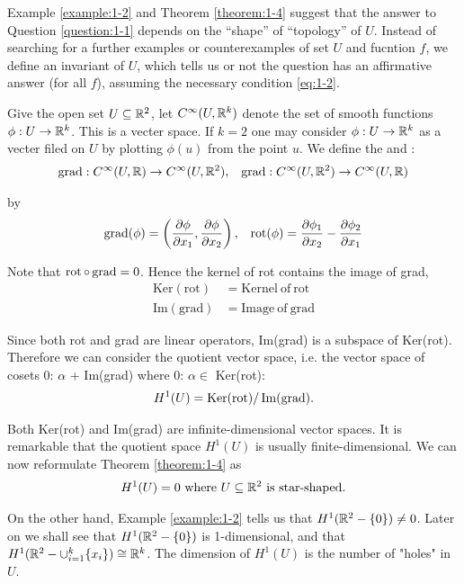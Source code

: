 Example \ref{example:1-2} and Theorem \ref{theorem:1-4} suggest that the answer to Question \ref{question:1-1} depends on the ``shape'' of
``topology'' of $U$. Instead of searching for a further examples or counterexamples of set $U$ and fucntion $f$, we
define an invariant of $U$, which tells us or not the question has an affirmative answer (for all $f$), assuming the 
necessary condition \eqref{eq:1-2}.

Give the open set $U\subseteq \mathbb{R}^2$, let $C^\infty(U, \mathbb{R}^k)$ denote the set of smooth functions $\phi:U\to\mathbb{R}^k$. This 
is a vecter space. If $k=2$ one may consider $\phi:U\to\mathbb{R}^k$ as a vecter filed on $U$ by plotting $\phi(u)$ from the
point $u$. We define the  and :
\begin{align*}
  \operatorname{grad}: C^\infty(U, \mathbb{R}) \to C^\infty(U, \mathbb{R}^2), &&
  \operatorname{grad}: C^\infty(U, \mathbb{R}^2) \to C^\infty(U, \mathbb{R}) 
\end{align*}

by 
\begin{align*}
  \operatorname{grad}(\phi) = \left(\frac{\partial \phi}{\partial x_1}, \frac{\partial \phi}{\partial x_2}\right), &&
  \operatorname{rot}(\phi) = \frac{\partial \phi_1}{\partial x_2} - \frac{\partial \phi_2}{\partial x_1}
\end{align*}

Note that $\operatorname{rot}\circ \operatorname{grad} = 0$. Hence the kernel of rot contains the image of grad,
\begin{align*}
  \mathrm{Ker}(\mathrm{rot})&=\mathrm{Kernel~of~rot}\\
  \mathrm{Im}(\mathrm{grad})&=\mathrm{Image~of~grad}
\end{align*}

Since both rot and grad are linear operators, Im(grad) is a subspace of Ker(rot).
Therefore we can consider the quotient vector space, i.e. the vector space of
cosets 0: $\alpha$ + Im(grad) where 0: $\alpha\in$ Ker(rot):
\begin{align}\label{eq:1-3}
  H^1(U) = \operatorname{Ker}(\operatorname{rot})/\operatorname{Im}(\operatorname{grad}).
\end{align}

Both Ker(rot) and Im(grad) are infinite-dimensional vector spaces. It is remarkable 
that the quotient space $H^1(U)$ is usually finite-dimensional. We can now reformulate 
Theorem \ref{theorem:1-4} as
\begin{align}\label{eq:1-4}
  H^1(U) = 0 \text{ where } U\subseteq \mathbb{R}^2 \text{ is star-shaped}.
\end{align}

On the other hand, Example \ref{example:1-2} tells us that $H^1(\mathbb{R}^2 - \{0\})\neq 0$. Later on we shall
see that $H^1(\mathbb{R}^2 - \{0\})$ is 1-dimensional, and that $H^1(\mathbb{R}^2 - \cup_{i=1}^k\{x_i\}) \cong \mathbb{R}^k$. 
The dimension of $H^1(U)$ is the number of "holes" in $U$.

